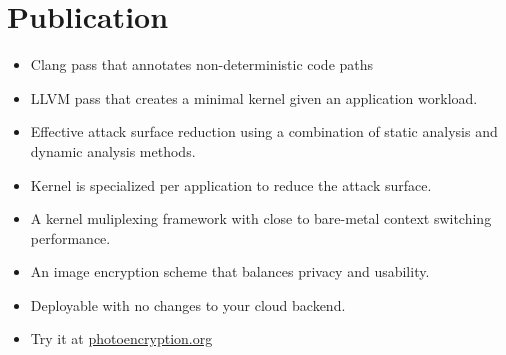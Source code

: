 \documentclass[11pt,a4paper,sans]{moderncv}
\begin{document}
\makecvtitle

\section{Publication}
{
    \begin{itemize}
        \item Clang pass that annotates non-deterministic code paths
        \item LLVM pass that creates a minimal kernel given an application
        workload.
        \item Effective attack surface reduction using a combination of static
        analysis and dynamic analysis methods.
    \end{itemize}
}

{
    \begin{itemize}
        \item Kernel is specialized per application to reduce the attack
        surface.
        \item A kernel muliplexing framework with close to bare-metal context
        switching performance.
    \end{itemize}
}

{
    \begin{itemize}
    \item An image encryption scheme that balances privacy and usability.
    \item Deployable with no changes to your cloud backend.
    \item Try it at \href{https://photoencryption.org}{photoencryption.org}
    \end{itemize}
}

\end{document}
